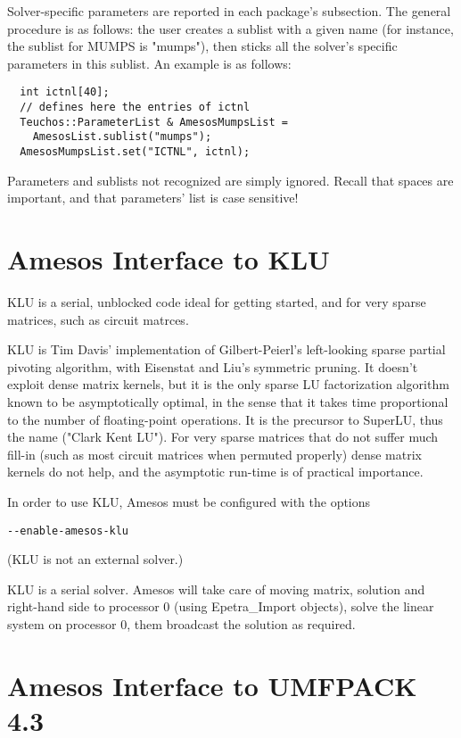 \documentclass[11pt]{SANDreport}
\begin{document}
Solver-specific parameters are reported in each package's
subsection. The general procedure is as follows: the user creates a
sublist with a given name (for instance, the sublist for MUMPS is
"mumps"), then sticks all the solver's specific parameters in this
sublist. An example is as follows:
\begin{verbatim}
  int ictnl[40];
  // defines here the entries of ictnl
  Teuchos::ParameterList & AmesosMumpsList = 
    AmesosList.sublist("mumps");
  AmesosMumpsList.set("ICTNL", ictnl);
\end{verbatim}
Parameters and sublists not recognized are simply ignored. Recall that
spaces are important, and that parameters' list is case sensitive!


\section{Amesos Interface to KLU}
\label{sec:klu}

KLU is a serial, unblocked code ideal for getting started, and for very
sparse matrices, such as circuit matrces.

KLU is Tim Davis' implementation of Gilbert-Peierl's left-looking sparse
partial pivoting algorithm, with Eisenstat and Liu's symmetric pruning.
It doesn't exploit dense matrix kernels, but it is the only sparse LU
factorization algorithm known to be asymptotically optimal, in the sense
that it takes time proportional to the number of floating-point
operations. It is the precursor to SuperLU, thus the name ("Clark Kent
LU"). For very sparse matrices that do not suffer much fill-in (such as
most circuit matrices when permuted properly) dense matrix kernels do
not help, and the asymptotic run-time is of practical importance.

\smallskip

In order to use KLU, Amesos must be configured with the options
\begin{verbatim}
--enable-amesos-klu
\end{verbatim}
(KLU is not an external solver.)

KLU is a serial solver. Amesos will take care of moving matrix,
solution and right-hand side to processor 0 (using Epetra\_Import
objects), solve the linear system on processor 0, them broadcast the
solution as required.


\section{Amesos Interface to UMFPACK 4.3}
\label{sec:umfpack}
\end{document}
